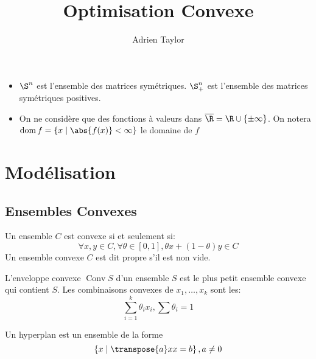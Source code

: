 \documentclass[math]{cours}
\title{Optimisation Convexe}
\author{Adrien Taylor}
\DeclareMathOperator{\conv}{Conv}
\DeclareMathOperator{\dom}{dom}
\def\barR{\overline{\R}}
\begin{document}
\bettertitle

\begin{notationT}
	\begin{multicols}{2}
		\begin{itemize}
			\item $\S^{n}$ est l'ensemble des matrices symétriques. $\S_{+}^{n}$ est l'ensemble des matrices symétriques positives.
			\item On ne considère que des fonctions à valeurs dans $\barR = \R \cup \{\pm \infty\}$.
			      On notera $\dom f = \left\{ x \mid \abs{f(x)} < \infty \right\}$ le domaine de $f$
		\end{itemize}
	\end{multicols}
\end{notationT}

\section{Modélisation}
\subsection{Ensembles Convexes}
\begin{definition}
	Un ensemble $C$ est convexe si et seulement si:
	\begin{equation*}
		\forall x, y \in C, \forall \theta \in [0, 1], \theta x + \left( 1 - \theta \right) y \in C
	\end{equation*}
	Un ensemble convexe $C$ est dit propre s'il est non vide.
\end{definition}

\begin{definition}
	L'enveloppe convexe $\conv S$ d'un ensemble $S$ est le plus petit ensemble convexe qui contient $S$.
	Les combinaisons convexes de $x_{1}, \ldots, x_{k}$ sont les:
	\begin{equation*}
		\sum_{i = 1}^{k} \theta_{i}x_{i}, \sum \theta_{i} = 1
	\end{equation*}
\end{definition}

\begin{definition}
	Un hyperplan est un ensemble de la forme
	\begin{equation*}
		\left\{ x \mid \transpose{a}x x = b \right\},  a\neq 0
	\end{equation*}
\end{definition}
\end{document}
